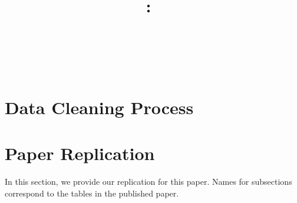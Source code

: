 \documentclass{article}
\title{
    \vspace{2in}
    \textmd{\textbf{\hmwkClasstwo:\ \\ \hmwkTitle}}\\
    \vspace{1in}\large{\textit{\hmwkClassInstructor}}
    \vspace{2in}
}
\author{\hmwkAuthorName
\  \\ \hmwkID
\vspace{0.3in}}
\date{}
\begin{document}
\maketitle

\pagebreak

\tableofcontents
\pagebreak
\listoffigures
\pagebreak
\listoftables
\pagebreak
\lstlistoflistings 
\pagebreak

\section{Data Cleaning Process}



\pagebreak

\section{Paper Replication}
In this section, we provide our replication for this paper. Names for subsections correspond to the tables in the published paper.
\end{document}
